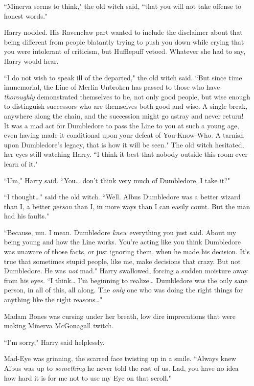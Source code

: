 ``Minerva seems to think," the old witch said, ``that you will not take offense to honest words."

Harry nodded. His Ravenclaw part wanted to include the disclaimer about that being different from people blatantly trying to push you down while crying that you were intolerant of criticism, but Hufflepuff vetoed. Whatever she had to say, Harry would hear.

``I do not wish to speak ill of the departed," the old witch said. ``But since time immemorial, the Line of Merlin Unbroken has passed to those who have \emph{thoroughly} demonstrated themselves to be, not only good people, but wise enough to distinguish successors who are themselves both good and wise. A single break, anywhere along the chain, and the succession might go astray and never return! It was a mad act for Dumbledore to pass the Line to you at such a young age, even having made it conditional upon your defeat of You-Know-Who. A tarnish upon Dumbledore's legacy, that is how it will be seen." The old witch hesitated, her eyes still watching Harry. ``I think it best that nobody outside this room ever learn of it."

``Um," Harry said. ``You{\ldots} don't think very much of Dumbledore, I take it?"

``I thought{\ldots}" said the old witch. ``Well. Albus Dumbledore was a better wizard than I, a better \emph{person} than I, in more ways than I can easily count. But the man had his faults."

``Because, um. I mean. Dumbledore \emph{knew} everything you just said. About my being young and how the Line works. You're acting like you think Dumbledore was unaware of those facts, or just ignoring them, when he made his decision. It's true that sometimes stupid people, like me, make decisions that crazy. But not Dumbledore. He was \emph{not} mad." Harry swallowed, forcing a sudden moisture away from his eyes. ``I think{\ldots} I'm beginning to realize{\ldots} Dumbledore was the only sane person, in all of this, all along. The \emph{only} one who was doing the right things for anything like the right reasons{\ldots}"

Madam Bones was cursing under her breath, low dire imprecations that were making Minerva McGonagall twitch.

``I'm sorry," Harry said helplessly.

Mad-Eye was grinning, the scarred face twisting up in a smile. ``Always knew Albus was up to \emph{something} he never told the rest of us. Lad, you have no idea how hard it is for me not to use my Eye on that scroll."

